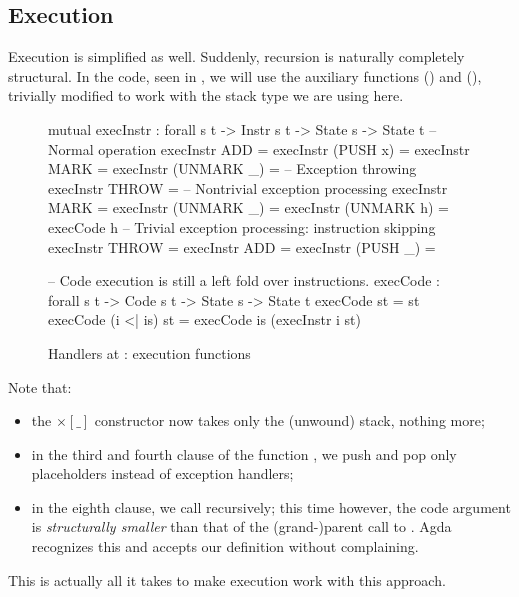 \subsection{Execution}

Execution is simplified as well. Suddenly, recursion is naturally completely
structural. In the code, seen in , we will use the auxiliary functions
 () and 
(), trivially modified to work with the stack type we
are using here.

\begin{figure}
\begin{codei}
  mutual
    execInstr : forall {s t} -> Instr s t -> State s -> State t
  	-- Normal operation
    execInstr ADD 					= \tick[ (x + y) \scons st ]
    execInstr (PUSH x)			\tick[ st ] 		= \tick[ x \scons st ]
    execInstr MARK				\tick[ st ] 		= 
    execInstr (UNMARK _)			= \tick[ x \scons st ]
    -- Exception throwing  
    execInstr THROW				\tick[ st ] =  
    -- Nontrivial exception processing
    execInstr MARK				\x[ n	 , st	] = \x[ suc n, st ]
    execInstr (UNMARK _)		\x[ suc n , st	] = \x[ n	, st ]
    execInstr (UNMARK h)		\x[ zero	 , st	] = execCode h \tick[ st ]
    -- Trivial exception processing: instruction skipping
    execInstr THROW			\x[ n , st ] = \x[ n , st ]
    execInstr ADD			\x[ n , st ] = \x[ n , st ]
    execInstr (PUSH _)		\x[ n , st ] = \x[ n , st ]
\end{codei}
\begin{code}
    -- Code execution is still a left fold over instructions.
    execCode : forall {s t} -> Code s t -> State s -> State t
    execCode \nil st = st
    execCode (i <| is) st = execCode is (execInstr i st)
\end{code}
\caption{Handlers at : execution functions}
\label{fig:hau-execInstr}
\end{figure}

Note that:
\begin{itemize}
	\item the $\times[\_]$ constructor now takes only the (unwound) stack, nothing more;
	\item in the third and fourth clause of the function ,
		we push and pop only placeholders instead of exception handlers;
	\item in the eighth clause, we call  recursively; this time however,
		the code argument  is \emph{structurally smaller} than that of
		the (grand-)parent call to . Agda recognizes this and
		accepts our definition without complaining.
\end{itemize}
This is actually all it takes to make execution work with this approach.

